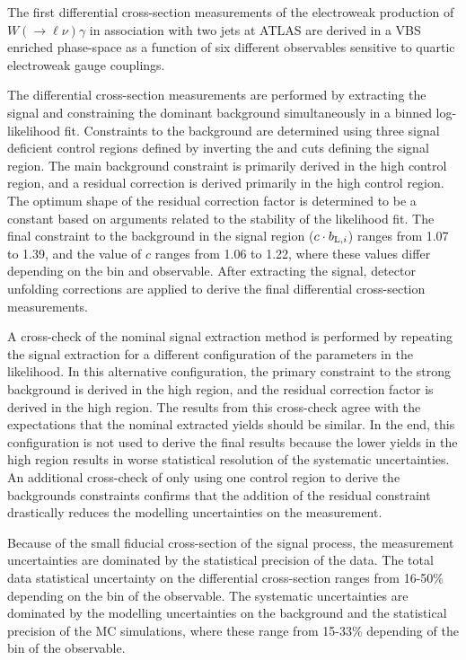 The first differential cross-section measurements of the electroweak production of $W(\rightarrow\ell\nu)\gamma$ in association with two jets at ATLAS are derived in a VBS enriched phase-space as a function of six different observables sensitive to quartic electroweak gauge couplings. %

The differential cross-section measurements are performed by extracting the \ewwy signal and constraining the dominant \qcdwy background simultaneously in a binned log-likelihood fit. Constraints to the background are determined using three signal deficient control regions defined by inverting the \lyxi and \ngapjets cuts defining the signal region. The main background constraint is primarily derived in the high \ngapjets control region, and a residual correction is derived primarily in the high \lyxi control region. The optimum shape of the residual correction factor is determined to be a constant based on arguments related to the stability of the likelihood fit. The final constraint to the \qcdwy background in the signal region ($c\cdot b_{\text{L},i}$) ranges from 1.07 to 1.39, and the value of $c$ ranges from 1.06 to 1.22, where these values differ depending on the bin and observable. After extracting the signal, detector unfolding corrections are applied to derive the final differential cross-section measurements.  

A cross-check of the nominal signal extraction method is performed by repeating the signal extraction for a different configuration of the parameters in the likelihood. In this alternative configuration, the primary constraint to the strong background is derived in the high \lyxi region, and the residual correction factor is derived in the high \ngapjets region. The results from this cross-check agree with the expectations that the nominal extracted yields should be similar. In the end, this configuration is not used to derive the final results because the lower yields in the high \lyxi region results in worse statistical resolution of the systematic uncertainties. An additional cross-check of only using one control region to derive the backgrounds constraints confirms that the addition of the residual constraint drastically reduces the modelling uncertainties on the measurement.

Because of the small fiducial cross-section of the signal process, the measurement uncertainties are dominated by the statistical precision of the data. The total data statistical uncertainty on the differential cross-section ranges from 16-50\% depending on the bin of the observable. The systematic uncertainties are dominated by the modelling uncertainties on the \qcdwy background and the statistical precision of the MC simulations, where these range from 15-33\% depending of the bin of the observable. %

